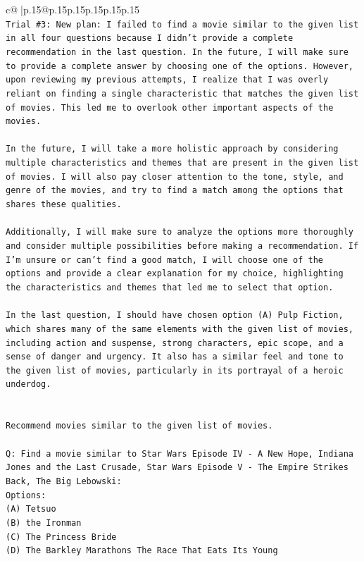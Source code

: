 \documentclass{article}
\begin{document}
{\begin{supertabular}{c@{$\;$}|p{.15\linewidth}@{}p{.15\linewidth}p{.15\linewidth}p{.15\linewidth}p{.15\linewidth}p{.15\linewidth}}
{{{\\ 
\texttt{Trial \#3: New plan: I failed to find a movie similar to the given list in all four questions because I didn't provide a complete recommendation in the last question. In the future, I will make sure to provide a complete answer by choosing one of the options. However, upon reviewing my previous attempts, I realize that I was overly reliant on finding a single characteristic that matches the given list of movies. This led me to overlook other important aspects of the movies.} \\
\\ 
\texttt{In the future, I will take a more holistic approach by considering multiple characteristics and themes that are present in the given list of movies. I will also pay closer attention to the tone, style, and genre of the movies, and try to find a match among the options that shares these qualities.} \\
\\ 
\texttt{Additionally, I will make sure to analyze the options more thoroughly and consider multiple possibilities before making a recommendation. If I'm unsure or can't find a good match, I will choose one of the options and provide a clear explanation for my choice, highlighting the characteristics and themes that led me to select that option.} \\
\\ 
\texttt{In the last question, I should have chosen option (A) Pulp Fiction, which shares many of the same elements with the given list of movies, including action and suspense, strong characters, epic scope, and a sense of danger and urgency. It also has a similar feel and tone to the given list of movies, particularly in its portrayal of a heroic underdog.} \\
\\ 
\\ 
\texttt{Recommend movies similar to the given list of movies.} \\
\\ 
\texttt{Q: Find a movie similar to Star Wars Episode IV {-} A New Hope, Indiana Jones and the Last Crusade, Star Wars Episode V {-} The Empire Strikes Back, The Big Lebowski:} \\
\texttt{Options:} \\
\texttt{(A) Tetsuo} \\
\texttt{(B) the Ironman} \\
\texttt{(C) The Princess Bride} \\
\texttt{(D) The Barkley Marathons The Race That Eats Its Young} \\
}}}
\end{supertabular}}
\end{document}
